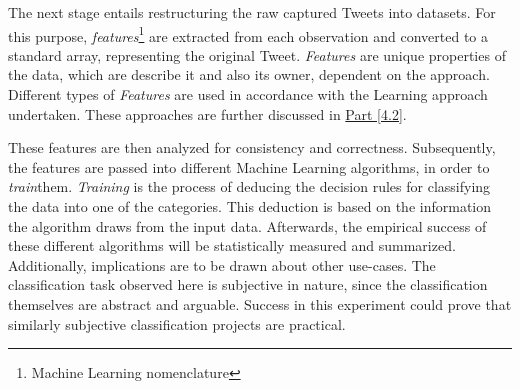 	The next stage entails restructuring the raw captured Tweets into datasets. For this purpose, \textit{features}\footnote{\label{ml_note}Machine Learning nomenclature} are extracted from each observation and converted to a standard array, representing the original Tweet. \textit{Features} are unique properties of the data, which are describe it and also its owner, dependent on the approach. Different types of \textit{Features} are used in accordance with the Learning approach undertaken. These approaches are further discussed in \hyperref[build_features]{Part [4.2]}.
	\par
	These features are then analyzed for consistency and correctness. Subsequently, the features are passed into different Machine Learning algorithms, in order to \textit{train}\footnotemark[1] them. \textit{Training} is the process of deducing the decision rules for classifying the data into one of the categories. This deduction is based on the information the algorithm draws from the input data. Afterwards, the empirical success of these different algorithms will be statistically measured and summarized. Additionally, implications are to be drawn about other use-cases. The classification task observed here is subjective in  nature, since the classification themselves are abstract and arguable. Success in this experiment could prove that similarly subjective classification projects are practical. 
	
